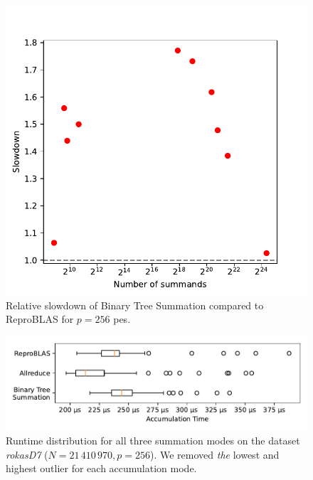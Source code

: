 \begin{figure}
\centering
\includegraphics[scale=0.75]{figures/slowdownPlot.pdf}
\caption{Relative slowdown of Binary Tree Summation compared to ReproBLAS for $p=256$ \glspl{pe}.}
\label{fig:slowdownPlot}
\end{figure}

\begin{figure}
\centering
\includegraphics[scale=0.75]{figures/boxplotRokasD7.pdf}
\caption[Runtime distribution for all three summation modes on the dataset \textit{rokasD7}.]{Runtime distribution for all three summation modes on the dataset \textit{rokasD7} ($N = 21\,410\,970, p = 256$). We removed \textit{the} lowest and highest outlier for each accumulation mode.}
\label{fig:boxplotRokasD7}
\end{figure}

